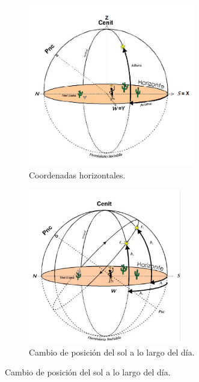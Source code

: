 \begin{figure}[h]
	\centering
	\begin{subfigure}{0.45\textwidth}
		\centering
		\includegraphics[width=0.8\textwidth]{Cuerpo/Imagenes/01_Horizontales.png}	
		\caption{Coordenadas horizontales.}
	\end{subfigure}
	\hfill
	\begin{subfigure}{0.45\textwidth}
		\centering
		\includegraphics[width=0.75\textwidth]{Cuerpo/Imagenes/01_Horizontales_2.png}	
		\caption{Cambio de posición del sol a lo largo del día.}
	\end{subfigure}
\end{figure}

